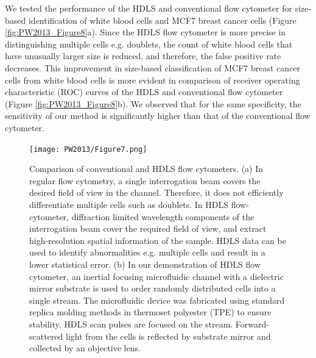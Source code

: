 We tested the performance of the HDLS and conventional flow cytometer for size-based identification of white blood cells and MCF7 breast cancer cells (Figure \ref{fig:PW2013_Figure8}a). Since the HDLS flow cytometer is more precise in distinguishing multiple cells e.g. doublets, the count of white blood cells that have unusually larger size is reduced, and therefore, the false positive rate decreases. This improvement in size-based classification of MCF7 breast cancer cells from white blood cells is more evident in comparison of receiver operating characteristic (ROC) curves of the HDLS and conventional flow cytometer (Figure \ref{fig:PW2013_Figure8}b). We observed that for the same specificity, the sensitivity of our method is significantly higher than that of the conventional flow cytometer. 
 
\begin{figure}[htb!]
\centering
\texttt{[image: PW2013/Figure7.png]}
\caption{Comparison of conventional and HDLS flow cytometers. (a) In regular flow cytometry, a single interrogation beam covers the desired field of view in the channel. Therefore, it does not efficiently differentiate multiple cells such as doublets. In HDLS flow-cytometer, diffraction limited wavelength components of the interrogation beam cover the required field of view, and extract high-resolution spatial information of the sample. HDLS data can be used to identify abnormalities e.g. multiple cells and result in a lower statistical error. (b) In our demonstration of HDLS flow cytometer, an inertial focusing microfluidic channel with a dielectric mirror substrate is used to order randomly distributed cells into a single stream. The microfluidic device was fabricated using standard replica molding methods in thermoset polyester (TPE) to ensure stability. HDLS scan pulses are focused on the stream. Forward-scattered light from the cells is reflected by substrate mirror and collected by an objective lens.}
\label{fig:PW2013_Figure7}
\end{figure}
 
